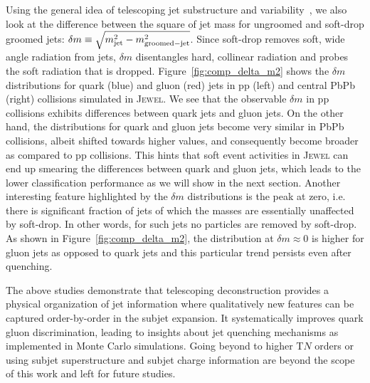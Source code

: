 \documentclass[notoc,preprintnumbers]{JHEP3}
\begin{document}
Using the general idea of telescoping jet substructure and variability~\cite{Chien:2017xrb}, we also look at the difference between the square of jet mass for ungroomed and soft-drop groomed jets: $\delta m \equiv \sqrt{m_{\rm jet}^2-m_{\rm groomed-jet}^2}$. Since soft-drop removes soft, wide angle radiation from jets, $\delta m$ disentangles hard, collinear radiation and probes the soft radiation that is dropped. Figure~\ref{fig:comp_delta_m2} shows the $\delta m$ distributions for quark (blue) and gluon (red) jets in pp (left) and central PbPb (right) collisions simulated in \textsc{Jewel}. We see that the observable $\delta m$ in pp collisions exhibits differences between quark jets and gluon jets. On the other hand, the distributions for quark and gluon jets become very similar in PbPb collisions, albeit shifted towards higher values, and consequently become broader as compared to pp collisions. This hints that soft event activities in \textsc{Jewel} can end up smearing the differences between quark and gluon jets, which leads to the lower classification performance as we will show in the next section. Another interesting feature highlighted by the $\delta m$ distributions is the peak at zero, i.e. there is significant fraction of jets of which the masses are essentially unaffected by soft-drop. In other words, for such jets no particles are removed by soft-drop. As shown in Figure~\ref{fig:comp_delta_m2}, the distribution at $\delta m \approx 0$ is higher for gluon jets as opposed to quark jets and this particular trend persists even after quenching.

The above studies demonstrate that telescoping deconstruction provides a physical organization of jet information where qualitatively new features can be captured order-by-order in the subjet expansion. It systematically improves quark gluon discrimination, leading to insights about jet quenching mechanisms as implemented in Monte Carlo simulations. Going beyond to higher T$N$ orders or using subjet superstructure \cite{Gallicchio:2010sw} and subjet charge \cite{Krohn:2012fg} information are beyond the scope of this work and left for future studies.
\end{document}
